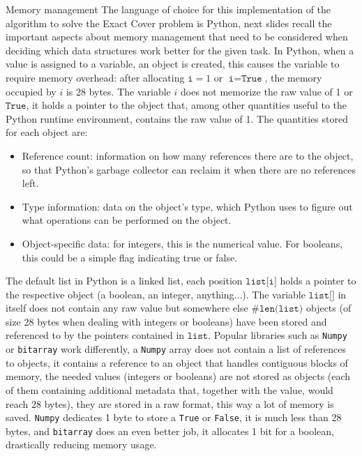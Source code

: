 \documentclass{beamer}
\begin{document}

\begin{frame}{Memory management}
    \small
    The language of choice for this implementation of the algorithm
    to solve the Exact Cover problem is Python, next slides recall
    the important aspects about memory management that need to be 
    considered when deciding which data structures work better for the
    given task.
    In Python, when a value is assigned to a variable, an object is created, this
    causes the variable to require memory overhead: after
    allocating $\texttt{i} = 1$ or $\texttt{i} = \texttt{True}$, the memory occupied by
    $i$ is 28 bytes.
    The variable $i$ does not memorize the raw value of 1 or $\texttt{True}$, it holds
    a pointer to the object that, among other quantities useful to the Python
    runtime environment, contains the raw value of 1. The quantities
    stored for each object are:
    \begin{itemize}
        \item Reference count: information on how many references there 
        are to the object, so that Python's garbage collector can reclaim it 
        when there are no references left. 
        \item Type information: data on the object's type, which Python 
        uses to figure out what operations can be performed on the object.
        \item Object-specific data: for integers, this is the numerical value. 
        For booleans, this could be a simple flag indicating true or false.
    \end{itemize}
\end{frame}

\begin{frame}{}
    The default list in Python is a linked list, each position $\texttt{list[i]}$ holds a pointer to the
    respective object
    (a boolean, an integer, anything...).
    The variable $\texttt{list[]}$ in itself does not contain any raw value but somewhere else
    $\#\texttt{len(list)}$ objects (of size 28 bytes when dealing with integers or booleans)
    have been stored and referenced to by the pointers contained in $\texttt{list}$.
    Popular libraries such as \texttt{Numpy} or \texttt{bitarray} work differently,
    a \texttt{Numpy} array does not contain a list of references to objects, it contains
    a reference to an object that handles contiguous blocks of memory, the needed
    values (integers or booleans) are not stored as objects (each of them containing additional metadata
    that, together with the value, would reach 28 bytes), they are stored in a raw format,
    this way a lot of memory is saved.
    \texttt{Numpy} dedicates 1 byte to store a \texttt{True} or \texttt{False}, it is much less
    than 28 bytes, and \texttt{bitarray} does an even better job, it allocates 1 bit for a boolean,
    drastically reducing memory usage.
\end{frame}
\end{document}
